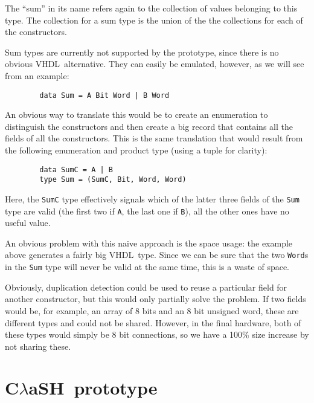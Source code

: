 \documentclass[conference]{IEEEtran}
\def\VHDL{\textsc{VHDL}}
\def\CLaSH{C$\lambda$aSH}
\def\hs#1{\texttt{#1}}
\begin{document}
\begin{description}
        The ``sum'' in its name refers again to the collection of values
        belonging to this type. The collection for a sum type is the
        union of the the collections for each of the constructors.

        Sum types are currently not supported by the prototype, since there is
        no obvious \VHDL\ alternative. They can easily be emulated, however, as
        we will see from an example:

        \begin{verbatim}
        data Sum = A Bit Word | B Word
        \end{verbatim}

        An obvious way to translate this would be to create an enumeration to
        distinguish the constructors and then create a big record that
        contains all the fields of all the constructors. This is the same
        translation that would result from the following enumeration and
        product type (using a tuple for clarity):

        \begin{verbatim}
        data SumC = A | B
        type Sum = (SumC, Bit, Word, Word)
        \end{verbatim}

        Here, the \hs{SumC} type effectively signals which of the latter three
        fields of the \hs{Sum} type are valid (the first two if \hs{A}, the
        last one if \hs{B}), all the other ones have no useful value.

        An obvious problem with this naive approach is the space usage: the
        example above generates a fairly big \VHDL\ type. Since we can be
        sure that the two \hs{Word}s in the \hs{Sum} type will never be valid
        at the same time, this is a waste of space.

        Obviously, duplication detection could be used to reuse a
        particular field for another constructor, but this would only
        partially solve the problem. If two fields would be, for
        example, an array of 8 bits and an 8 bit unsigned word, these are
        different types and could not be shared. However, in the final
        hardware, both of these types would simply be 8 bit connections,
        so we have a 100\% size increase by not sharing these.
      \end{description}


\section{\CLaSH\ prototype}
\end{document}
